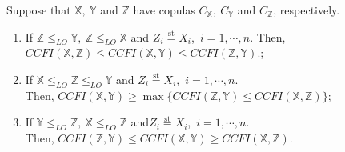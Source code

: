\documentclass[10pt,a4paper]{amsart}
\begin{document}
\begin{proposition}\label{prop3.6}
Suppose that $\mathbb{X},~\mathbb{Y}$ and $\mathbb{Z}$ have copulas $C_\mathbb{X},~C_\mathbb{Y}$ and $C_\mathbb{Z}$, respectively. 
\begin{enumerate}
\item If $\mathbb{Z}\le_{LO}\mathbb{Y},~\mathbb{Z}\le_{LO}\mathbb{X}$ and $Z_i\overset{\mathrm{st}}{=}X_i$,~$i=1,\cdots,n$. 
Then, $CCFI(\mathbb X,\mathbb Z)\leq CCFI(\mathbb X,\mathbb Y)\le CCFI(\mathbb Z,\mathbb Y).$;
\item  If $\mathbb{X}\le_{LO}\mathbb{Z}\le_{LO}\mathbb{Y}$ and $Z_i\overset{\mathrm{st}}{=}X_i$,~$i=1,\cdots,n$. \\Then,
 $CCFI(\mathbb{X},\mathbb{Y})\ge \max\{CCFI(\mathbb{Z},\mathbb{Y})\le CCFI(\mathbb{X},\mathbb{Z})\}$;
\item If $\mathbb{Y}\le_{LO}\mathbb{Z},~\mathbb{X}\le_{LO}\mathbb{Z}$ and$Z_i\overset{\mathrm{st}}{=}X_i$,~$i=1,\cdots,n$. \\Then,
 $CCFI(\mathbb Z,\mathbb Y)\leq CCFI(\mathbb{X},\mathbb{Y})\ge CCFI(\mathbb X,\mathbb Z)$.
\end{enumerate}
\end{proposition}
\end{document}
